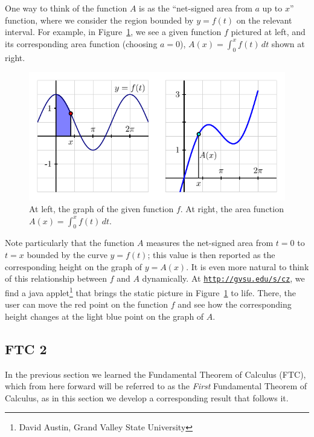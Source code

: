 One way to think of the function $A$ is as the ``net-signed area from $a$ up to $x$'' function, where we consider the region bounded by $y = f(t)$ on the relevant interval.  For example, in Figure~\ref{F:5.1.IntFxn}, we see a given function $f$ pictured at left, and its corresponding area function (choosing $a = 0$), $A(x) = \int_0^x f(t) \, dt$ shown at right.

\begin{figure}[h]
\begin{center}
\includegraphics{figures/5_1_IntFxn}
\end{center}
\caption{At left, the graph of the given function $f$.  At right, the area function $A(x) = \int_0^x f(t) \, dt$.} \label{F:5.1.IntFxn}
\end{figure}

Note particularly that the function $A$ measures the net-signed area from $t = 0$ to $t = x$ bounded by the curve $y = f(t)$; this value is then reported as the corresponding height on the graph of $y = A(x)$.  It is even more natural to think of this relationship between $f$ and $A$ dynamically.  At \href{http://gvsu.edu/s/cz}{\texttt{http://gvsu.edu/s/cz}}, we find a java applet\footnote{David Austin, Grand Valley State University} that brings the static picture in Figure~\ref{F:5.1.IntFxn} to life.  There, the user can move the red point on the function $f$ and see how the corresponding height changes at the light blue point on the graph of $A$.


\subsection{FTC 2} \label{sec:FTC2}

In the previous section we learned the Fundamental Theorem of Calculus (FTC), which from here forward will be referred to as the \emph{First} Fundamental Theorem of Calculus, as in this section we develop a corresponding result that follows it.

